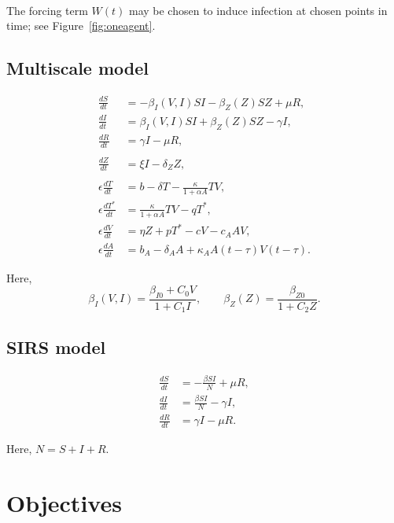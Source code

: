 \documentclass[11pt]{article}
\numberwithin{equation}{subsection}
\begin{document}
    ~

    The forcing term $W(t)$ may be chosen to induce infection at chosen points
    in time; see Figure~\ref{fig:oneagent}.


    \subsection{Multiscale model} \label{model:multiscale}

    \begin{align}
        \frac{dS}{dt} &= -\beta_I(V, I) SI - \beta_Z(Z) SZ + \mu R, \\
        \frac{dI}{dt} &= \beta_I(V, I) SI + \beta_Z(Z) SZ - \gamma I, \\
        \frac{dR}{dt} &= \gamma I - \mu R, \\\\
        \frac{dZ}{dt} &= \xi I - \delta_Z Z, \\\\
        \epsilon \frac{dT}{dt} &= b -  \delta T - \frac{\kappa}{1 + \alpha A} TV, \\
        \epsilon \frac{dT^*}{dt} &= \frac{\kappa}{1 + \alpha A} TV - qT^*, \\
        \epsilon \frac{dV}{dt} &= \eta Z + pT^* - cV - c_A AV, \\
        \epsilon \frac{dA}{dt} &= b_A -  \delta_A A + \kappa_A A(t - \tau)V(t - \tau).
    \end{align}

    Here, \[
        \beta_I(V, I) = \frac{\beta_{I0} + C_0 V}{1 + C_1 I}, \qquad
        \beta_Z(Z) = \frac{\beta_{Z0}}{1 + C_2 Z}.
    \]


    \subsection{SIRS model} \label{model:SIRS}

    \begin{align}
        \frac{dS}{dt} &= -\frac{\beta SI}{N} + \mu R, \\
        \frac{dI}{dt} &= \frac{\beta SI}{N} - \gamma I, \\
        \frac{dR}{dt} &= \gamma I - \mu R.
    \end{align}

    Here, $N = S + I + R$.


    \section{Objectives}
\end{document}
